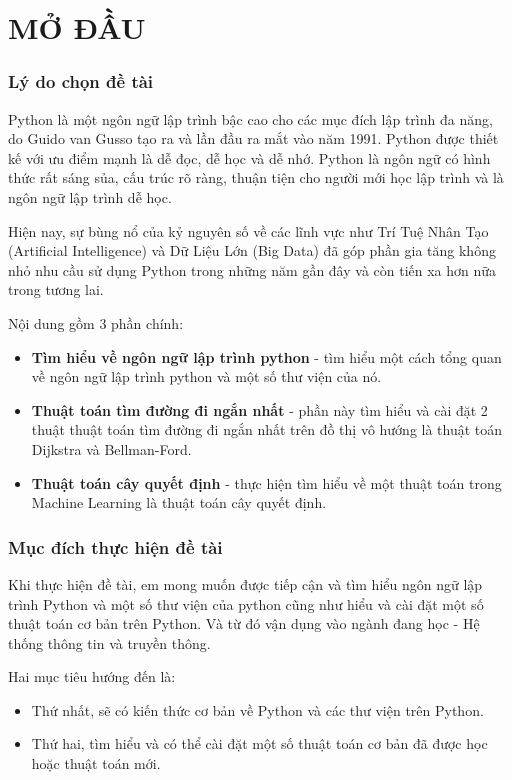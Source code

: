 \documentclass[../main-report.tex]{subfiles}
\begin{document}
\part*{MỞ ĐẦU}
\section*{Lý do chọn đề tài}
Python là một ngôn ngữ lập trình bậc cao cho các mục đích lập trình đa năng, do Guido
van Gusso tạo ra và lần đầu ra mắt vào năm 1991. Python được thiết kế với ưu điểm mạnh là dễ
đọc, dễ học và dễ nhớ. Python là ngôn ngữ có hình thức rất sáng sủa, cấu trúc rõ ràng, thuận tiện
cho người mới học lập trình và là ngôn ngữ lập trình dễ học.

Hiện nay, sự bùng nổ của kỷ nguyên số về các lĩnh vực như Trí Tuệ Nhân Tạo (Artificial
Intelligence) và Dữ Liệu Lớn (Big Data) đã góp phần gia tăng không nhỏ nhu cầu sử dụng
Python trong những năm gần đây và còn tiến xa hơn nữa trong tương lai.

Nội dung gồm 3 phần chính:

\begin{itemize}
\item \textbf{Tìm hiểu về ngôn ngữ lập trình python} - tìm hiểu một cách tổng quan về ngôn ngữ lập trình python và một số thư viện của nó.
\item \textbf{Thuật toán tìm đường đi ngắn nhất} - phần này tìm hiểu và cài đặt 2 thuật thuật toán tìm đường đi ngắn nhất trên đồ thị vô hướng là thuật toán Dijkstra và Bellman-Ford.
\item \textbf{Thuật toán cây quyết định} - thực hiện tìm hiểu về một thuật toán trong Machine Learning là thuật toán cây quyết định.
\end{itemize}

\section*{Mục đích thực hiện đề tài}
Khi thực hiện đề tài, em mong muốn được tiếp cận và tìm hiểu ngôn ngữ lập trình Python và một số thư viện của python cũng như hiểu và cài đặt một số thuật toán cơ bản trên Python. Và từ đó vận dụng vào ngành đang học - Hệ thống thông tin và truyền thông.

Hai mục tiêu hướng đến là:

\begin{itemize}
\item Thứ nhất, sẽ có kiến thức cơ bản về Python và các thư viện trên Python.
\item Thứ hai, tìm hiểu và có thể cài đặt một số thuật toán cơ bản đã được học hoặc thuật toán mới.
\end{itemize}
\end{document}
